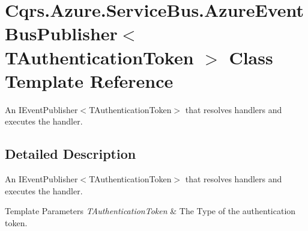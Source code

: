 \hypertarget{classCqrs_1_1Azure_1_1ServiceBus_1_1AzureEventBusPublisher}{}\section{Cqrs.\+Azure.\+Service\+Bus.\+Azure\+Event\+Bus\+Publisher$<$ T\+Authentication\+Token $>$ Class Template Reference}
\label{classCqrs_1_1Azure_1_1ServiceBus_1_1AzureEventBusPublisher}


An I\+Event\+Publisher$<$\+T\+Authentication\+Token$>$ that resolves handlers and executes the handler.  




\subsection{Detailed Description}
An I\+Event\+Publisher$<$\+T\+Authentication\+Token$>$ that resolves handlers and executes the handler. 


\begin{DoxyTemplParams}{Template Parameters}
{\em T\+Authentication\+Token} & The Type of the authentication token.\\
\hline
\end{DoxyTemplParams}
